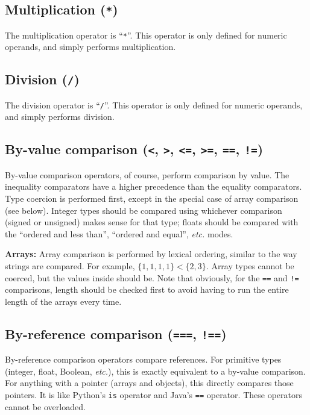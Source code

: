 \documentclass{article}
\begin{document}
\subsection{Multiplication (\texttt{*})}
\label{sub:operators:mul}
The multiplication operator is ``\texttt{*}''. This operator is only defined for
numeric operands, and simply performs multiplication.

\subsection{Division (\texttt{/})}
\label{sub:operators:mul}
The division operator is ``\texttt{/}''. This operator is only defined for
numeric operands, and simply performs division.

\subsection{By-value comparison (\texttt{<}, \texttt{>}, \texttt{<=},
  \texttt{>=}, \texttt{==}, \texttt{!=})}
\label{sub:operators:valcomp}
By-value comparison operators, of course, perform comparison by value. The
inequality comparators have a higher precedence than the equality
comparators. Type coercion is performed first, except in the special case of
array comparison (see below). Integer types should be compared using whichever
comparison (signed or unsigned) makes sense for that type; floats should be
compared with the ``ordered and less than'', ``ordered and equal'',
{\it etc.} modes.

\textbf{Arrays:} Array comparison is performed by lexical ordering, similar to
the way strings are compared. For example, $\{1, 1, 1, 1\} < \{2, 3\}$.
Array types cannot be coerced, but the values inside should be. Note that
obviously, for the \texttt{==} and \texttt{!=} comparisons, length should be
checked first to avoid having to run the entire length of the arrays every
time.

\subsection{By-reference comparison (\texttt{===}, \texttt{!==})}
\label{sub:operators:refcomp}
By-reference comparison operators compare references. For primitive types
(integer, float, Boolean, {\it etc.}), this is exactly equivalent to a
by-value comparison. For anything with a pointer (arrays and objects), this
directly compares those pointers. It is like Python's \texttt{is} operator
and Java's \texttt{==} operator. These operators cannot be overloaded.
\end{document}
